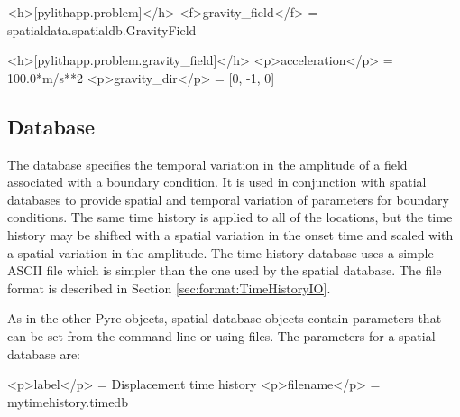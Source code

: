 \begin{inventory}
\end{inventory}

\begin{cfg}
<h>[pylithapp.problem]</h>
<f>gravity_field</f> = spatialdata.spatialdb.GravityField

<h>[pylithapp.problem.gravity_field]</h>
<p>acceleration</p> = 100.0*m/s**2
<p>gravity_dir</p> = [0, -1, 0]
\end{cfg}


\subsection{\protect{} Database}
\label{sec:time:history:database}

The  database specifies the temporal variation in the
amplitude of a field associated with a boundary condition. It is used
in conjunction with spatial databases to provide spatial and temporal
variation of parameters for boundary conditions. The same time history
is applied to all of the locations, but the time history may be shifted
with a spatial variation in the onset time and scaled with a spatial
variation in the amplitude. The time history database uses a simple
ASCII file which is simpler than the one used by the  spatial
database. The file format is described in Section \vref{sec:format:TimeHistoryIO}. 

As in the other Pyre objects, spatial database objects contain parameters
that can be set from the command line or using 
files. The parameters for a spatial database are:
\begin{inventory}
\end{inventory}

\begin{cfg}
<p>label</p> = Displacement time history
<p>filename</p> = mytimehistory.timedb
\end{cfg}


